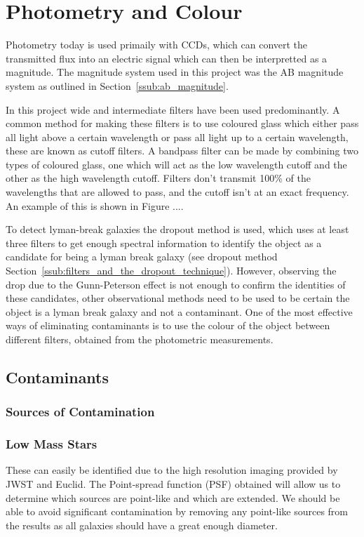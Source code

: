 
\section{Photometry and Colour} %
\label{sec:Photometry_Colour}
	Photometry today is used primaily with CCDs, which can convert the transmitted flux into an electric signal which can then be interpretted as a magnitude. The magnitude system used in this project was the AB magnitude system as outlined in Section~\ref{ssub:ab_magnitude}.

	In this project wide and intermediate filters have been used predominantly. A common method for making these filters is to use coloured glass which either pass all light above a certain wavelength or pass all light up to a certain wavelength, these are known as cutoff filters. A bandpass filter can be made by combining two types of coloured glass, one which will act as the low wavelength cutoff and the other as the high wavelength cutoff. Filters don't transmit 100\% of the wavelengths that are allowed to pass, and the cutoff isn't at an exact frequency. An example of this is shown in Figure ....

	To detect lyman-break galaxies the dropout method is used, which uses at least three filters to get enough spectral information to identify the object as a candidate for being a lyman break galaxy (see dropout method Section~\ref{ssub:filters_and_the_dropout_technique}). However, observing the drop due to the Gunn-Peterson effect is not enough to confirm the identities of these candidates, other observational methods need to be used to be certain the object is a lyman break galaxy and not a contaminant. One of the most effective ways of eliminating contaminants is to use the colour of the object between different filters, obtained from the photometric measurements.

    \subsection{Contaminants} %
    \label{sub:Contanimants}
    	\subsubsection{Sources of Contamination} %
    	\label{ssub:sources_of_contamination}

		    \subsubsection*{Low Mass Stars} %
		    \label{sub:low_mass_stars}
		        These can easily be identified due to the high resolution imaging provided by JWST and Euclid. The Point-spread function (PSF) obtained will allow us to determine which sources are point-like and which are extended. We should be able to avoid significant contamination by removing any point-like sources from the results as all galaxies should have a great enough diameter.


